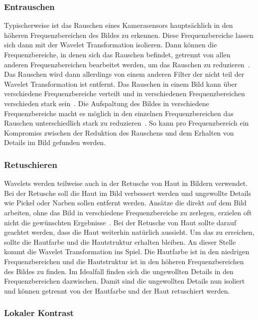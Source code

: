 \documentclass[12pt, a4paper, ngerman]{article}
\begin{document}
\subsubsection{Entrauschen}

Typischerweise ist das Rauschen eines Kamerasensors
hauptsächlich in den höheren Frequenzbereichen des Bildes zu erkennen.
Diese Frequenzbereiche lassen sich dann mit der Wavelet Transformation isolieren.
Dann können die Frequenzbereiche, in denen sich das Rauschen befindet,
getrennt von allen anderen Frequenzbereichen bearbeitet werden,
um das Rauschen zu reduzieren~\cite[S.117]{dt_manual}.
Das Rauschen wird dann allerdings von einem anderen Filter
der nicht teil der Wavelet Transformation ist entfernt.
Das Rauschen in einem Bild kann über verschiedene Frequenzbereiche verteilt
und in verschiedenen Frequenzbereichen verschieden stark sein~\cite[S.119]{dt_manual}.
Die Aufspaltung des Bildes in verschiedene Frequenzbereiche
macht es möglich in den einzelnen Frequenzbereichen
das Rauschen unterschiedlich stark zu reduzieren~\cite[S.119]{dt_manual}.
So kann pro Frequenzbereich ein Kompromiss zwischen der Reduktion des Rauschens
und dem Erhalten von Details im Bild gefunden werden.

\subsubsection{Retuschieren}

Wavelets werden teilweise auch in der Retusche von Haut in Bildern verwendet.
Bei der Retusche soll die Haut im Bild verbessert werden und ungewollte Details
wie Pickel oder Narben sollen entfernt werden.
Ansätze die direkt auf dem Bild arbeiten, 
ohne das Bild in verschiedene Frequenzbereiche zu zerlegen,
erzielen oft nicht die gewünschten Ergebnisse~\cite{skin_retouching}.
Bei der Retusche von Haut sollte darauf geachtet werden,
dass die Haut weiterhin natürlich aussieht.
Um das zu erreichen, sollte die Hautfarbe und die Hautstruktur erhalten bleiben.
An dieser Stelle kommt die Wavelet Transformation ins Spiel.
Die Hautfarbe ist in den niedrigen Frequenzbereichen
und die Hautstruktur ist in den höheren Frequenzbereichen des Bildes zu finden.
Im Idealfall finden sich die ungewollten Details 
in den Frequenzbereichen dazwischen.
Damit sind die ungewollten Details nun isoliert und können getrennt von
der Hautfarbe und der Haut retuschiert werden.


\subsubsection{Lokaler Kontrast}
\end{document}
